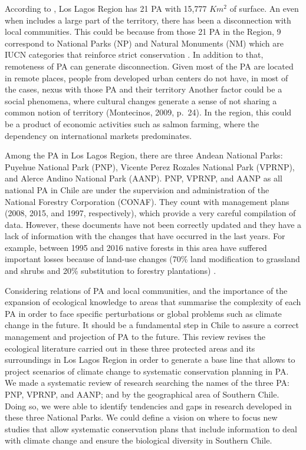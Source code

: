 \documentclass[]{article}
\begin{document}
According to \citet{ProtectedAreas}, Los Lagos Region has 21 PA with 15,777 \(Km^2\) of surface.
An even when includes a large part of the territory, there has been a disconnection with local communities.
This could be because from those 21 PA in the Region, 9 correspond to National Parks (NP) and Natural Monuments (NM) which are IUCN categories that reinforce strict conservation \citep{dudley2008guidelines}.
In addition to that, remoteness of PA can generate disconnection. Given most of the PA are located in remote places, people from developed urban centers do not have, in most of the cases, nexus with those PA and their territory \citep{joppa2009high}
Another factor could be a social phenomena, where cultural changes generate a sense of not sharing a common notion of territory (Montecinos, 2009, p.~24). In the region, this could be a product of economic activities such as salmon farming, where the dependency on international markets predominates.

Among the PA in Los Lagos Region, there are three Andean National Parks: Puyehue National Park (PNP), Vicente Perez Rozales National Park (VPRNP), and Alerce Andino National Park (AANP). PNP, VPRNP, and AANP as all national PA in Chile are under the supervision and administration of the National Forestry Corporation (CONAF). They count with management plans (2008, 2015, and 1997, respectively), which provide a very careful compilation of data. However, these documents have not been correctly updated and they have a lack of information with the changes that have occurred in the last years. For example, between 1995 and 2016 native forests in this area have suffered important losses because of land-use changes (70\% land modification to grassland and shrubs and 20\% substitution to forestry plantations) \citep{marquet2019biodiversidad}.

Considering relations of PA and local communities, and the importance of the expansion of ecological knowledge to areas that summarise the complexity of each PA in order to face specific perturbations or global problems such as climate change in the future. It should be a fundamental step in Chile to assure a correct management and projection of PA to the future.
This review revises the ecological literature carried out in these three protected areas and its surroundings in Los Lagos Region in order to generate a base line that allows to project scenarios of climate change to systematic conservation planning in PA.
We made a systematic review of research searching the names of the three PA: PNP, VPRNP, and AANP; and by the geographical area of Southern Chile.
Doing so, we were able to identify tendencies and gaps in research developed in these three National Parks. We could define a vision on where to focus new studies that allow systematic conservation plans that include information to deal with climate change and ensure the biological diversity in Southern Chile.
\end{document}
